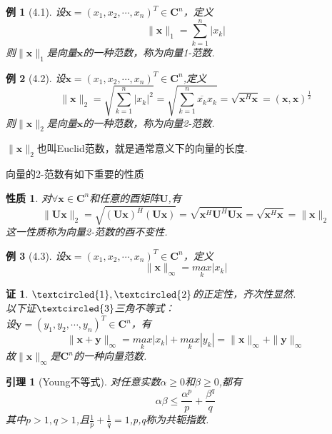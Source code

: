 \documentclass{sintefbeamer}[dark]
\newtheorem*{例}{例}
\newtheorem*{证}{证}
\newtheorem*{性质}{性质}
\newtheorem{引理}{引理}
\begin{document}
\begin{frame}
	\begin{例}[4.1]
		设$\bm{x}=(x_{1},x_{2},\cdots,x_{n})^{T}\in\mathbf{C}^{n}$，定义
		$$
		\|\bm{x}\|_{1}=\sum_{k=1}^{n}|x_{k}| 
		$$
		\linebreak
		则$\|\bm{x}\|_{1}$是向量$\bm{x}$的一种范数，称为向量1-范数.
		\end{例}
	\pause
	\begin{例}[4.2]
		设$\bm{x}=(x_{1},x_{2},\cdots,x_{n})^{T}\in\mathbf{C}^{n}$,定义
		$$
		\|\bm{x}\|_{2}=\sqrt{\sum_{k=1}^{n}|x_{k}|^{2}}=\sqrt{\sum_{k=1}^{n}\overline{x_{k}}x_{k}}=\sqrt{\bm{x}^{H}\bm{x}}=(\bm{x},\bm{x})^{\frac{1}{2} } 
		$$
		\linebreak
		则$\|\bm{x}\|_{2}$是向量$\bm{x}$的一种范数，称为向量2-范数.
		\end{例}
	\pause
	$\|\bm{x}\|_{2}$也叫Euclid范数，就是通常意义下的向量的长度.
	\end{frame}
\begin{frame}
	向量的2-范数有如下重要的性质
	\begin{性质}
		对${\forall}\bm{x}\in\mathbf{C}^{n}$和任意的酉矩阵$\bm{U}$,有
		$$
		\|\bm{U}\bm{x}\|_{2}= \sqrt{(\bm{U}\bm{x})^{H}(\bm{U}\bm{x})} =\sqrt{\bm{x}^{H}\bm{U}^{H}\bm{U}\bm{x}}=\sqrt{\bm{x}^{H}\bm{x}}=\|\bm{x}\|_{2}
		$$
		\linebreak
		这一性质称为向量2-范数的酉不变性.
		\end{性质}
\end{frame}


\begin{frame}
	\begin{例}[4.3]
		设$\bm{x}=(x_{1},x_{2},\cdots,x_{n})^{T}\in\mathbf{C}^{n}$，定义
		$$
		\|\bm{x}\|_{\infty }=\underset{k}{max}|x_{k}|
		$$
		\end{例}
	\pause
	\begin{证}
		$\textcircled{1},\textcircled{2}$的正定性，齐次性显然.
		\\
		以下证$\textcircled{3}$三角不等式：
		\\
		设$\bm{y}=(y_{1},y_{2},\cdots,y_{n})^{T}\in\mathbf{C}^{n}$，有
		$$
		\|\bm{x}+\bm{y}\|_{\infty}=\underset{k}{max}|x_{k}|+\underset{k}{max}|y_{k}|=\|\bm{x}\|_{\infty}+\|\bm{y}\|_{\infty}
		$$
		\linebreak
		故$\|\bm{x}\|_{\infty}$是$\mathbf{C}^{n}$的一种向量范数.
		\end{证}
\end{frame}

\begin{frame}
	\begin{引理}[Young不等式]
		对任意实数$\alpha \ge 0$和$\beta \ge 0$,都有
		$$
		\alpha \beta \le \frac{\alpha ^{p} }{p}+\frac{\beta ^{q} }{q}  
		$$
		\linebreak
		其中$p>1,q>1$,且$\frac{1}{p} +\frac{1}{q} =1$,p,q称为共轭指数.
		
		\end{引理}
\end{frame}
\end{document}
